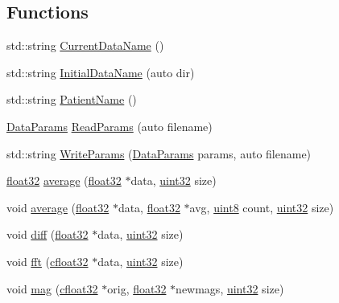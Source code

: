 \subsection*{Functions}
\begin{DoxyCompactItemize}
\item 
std\+::string \hyperlink{namespacevaso_abab641a332f2e834dfcdf294c0429426}{Current\+Data\+Name} ()
\item 
std\+::string \hyperlink{namespacevaso_af8f45524d4770053c2b812ce33a7095f}{Initial\+Data\+Name} (auto dir)
\item 
std\+::string \hyperlink{namespacevaso_a21e264fa912f7ca3f50e7e412ba1582e}{Patient\+Name} ()
\item 
\hyperlink{structDataParams}{Data\+Params} \hyperlink{namespacevaso_a6f1a23c617aae2e2c4af5e8016b4d03e}{Read\+Params} (auto filename)
\item 
std\+::string \hyperlink{namespacevaso_ad8543c0caabf3836b4a93a78e0d487d1}{Write\+Params} (\hyperlink{structDataParams}{Data\+Params} params, auto filename)
\item 
\hyperlink{definitions_8hpp_aacdc525d6f7bddb3ae95d5c311bd06a1}{float32} \hyperlink{namespacevaso_ad3205136b1cd04b4c6b9d7be73661796}{average} (\hyperlink{definitions_8hpp_aacdc525d6f7bddb3ae95d5c311bd06a1}{float32} $\ast$data, \hyperlink{definitions_8hpp_a1134b580f8da4de94ca6b1de4d37975e}{uint32} size)
\item 
void \hyperlink{namespacevaso_a9d0e5d69685ee494d286db6ece005156}{average} (\hyperlink{definitions_8hpp_aacdc525d6f7bddb3ae95d5c311bd06a1}{float32} $\ast$data, \hyperlink{definitions_8hpp_aacdc525d6f7bddb3ae95d5c311bd06a1}{float32} $\ast$avg, \hyperlink{definitions_8hpp_adde6aaee8457bee49c2a92621fe22b79}{uint8} count, \hyperlink{definitions_8hpp_a1134b580f8da4de94ca6b1de4d37975e}{uint32} size)
\item 
void \hyperlink{namespacevaso_a7d108bce812e906d8b1810815774c7ea}{diff} (\hyperlink{definitions_8hpp_aacdc525d6f7bddb3ae95d5c311bd06a1}{float32} $\ast$data, \hyperlink{definitions_8hpp_a1134b580f8da4de94ca6b1de4d37975e}{uint32} size)
\item 
void \hyperlink{namespacevaso_af74f08a8afd7967b6c2b3c2b0e5fb1e9}{fft} (\hyperlink{definitions_8hpp_a960be6b6614c08090c16574dba10a421}{cfloat32} $\ast$data, \hyperlink{definitions_8hpp_a1134b580f8da4de94ca6b1de4d37975e}{uint32} size)
\item 
void \hyperlink{namespacevaso_a5d355b5c326a852e2ce95c258450898c}{mag} (\hyperlink{definitions_8hpp_a960be6b6614c08090c16574dba10a421}{cfloat32} $\ast$orig, \hyperlink{definitions_8hpp_aacdc525d6f7bddb3ae95d5c311bd06a1}{float32} $\ast$newmags, \hyperlink{definitions_8hpp_a1134b580f8da4de94ca6b1de4d37975e}{uint32} size)

\end{DoxyCompactItemize}
